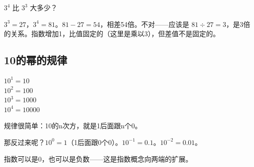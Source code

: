 \begin{example}
$3^4$ 比 $3^3$ 大多少？
\end{example}
\begin{solution}
$3^3=27$，$3^4=81$。$81-27=54$，相差54倍。不对——应该是 $81\div27=3$，是3倍的关系。指数增加1，比值固定的（这里是乘以3），但差值不是固定的。
\end{solution}

\subsection*{10的幂的规律}

$10^1=10$\\
$10^2=100$\\
$10^3=1000$\\
$10^4=10000$

规律很简单：10的n次方，就是1后面跟n个0。

那反过来呢？$10^0=1$（1后面跟0个0）。$10^{-1}=0.1$。$10^{-2}=0.01$。

指数可以是0，也可以是负数——这是指数概念向两端的扩展。


